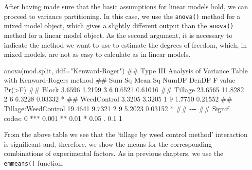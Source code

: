 \documentclass[a4paper,12pt,oneside]{book}
\newenvironment{Shaded}{\begin{snugshade}}{\end{snugshade}}
\newcommand{\StringTok}[1]{#1}
\newcommand{\DocumentationTok}[1]{#1}
\newcommand{\FunctionTok}[1]{#1}
\newcommand{\AttributeTok}[1]{#1}
\newcommand{\NormalTok}[1]{#1}
\begin{document}
After having made sure that the basic assumptions for linear models hold, we can proceed to variance partitioning. In this case, we use the \texttt{anova()} method for a mixed model object, which gives a slightly different output than the \texttt{anova()} method for a linear model object. As the second argument, it is necessary to indicate the method we want to use to estimate the degrees of freedom, which, in mixed models, are not as easy to calculate as in linear models.

\begin{Shaded}
\begin{Highlighting}[]
\FunctionTok{anova}\NormalTok{(mod.split, }\AttributeTok{ddf=}\StringTok{"Kenward{-}Roger"}\NormalTok{)}
\DocumentationTok{\#\# Type III Analysis of Variance Table with Kenward{-}Roger\textquotesingle{}s method}
\DocumentationTok{\#\#                      Sum Sq Mean Sq NumDF DenDF F value  Pr(\textgreater{}F)  }
\DocumentationTok{\#\# Block                3.6596  1.2199     3     6  0.6521 0.61016  }
\DocumentationTok{\#\# Tillage             23.6565 11.8282     2     6  6.3228 0.03332 *}
\DocumentationTok{\#\# WeedControl          3.3205  3.3205     1     9  1.7750 0.21552  }
\DocumentationTok{\#\# Tillage:WeedControl 19.4641  9.7321     2     9  5.2023 0.03152 *}
\DocumentationTok{\#\# {-}{-}{-}}
\DocumentationTok{\#\# Signif. codes:  0 \textquotesingle{}***\textquotesingle{} 0.001 \textquotesingle{}**\textquotesingle{} 0.01 \textquotesingle{}*\textquotesingle{} 0.05 \textquotesingle{}.\textquotesingle{} 0.1 \textquotesingle{} \textquotesingle{} 1}
\end{Highlighting}
\end{Shaded}

From the above table we see that the `tillage by weed control method' interaction is significant and, therefore, we show the means for the corresponding combinations of experimental factors. As in previous chapters, we use the \texttt{emmeans()} function.
\end{document}
